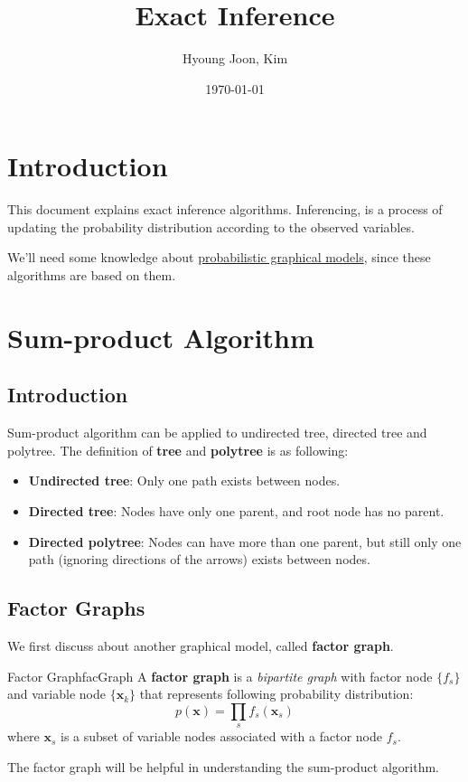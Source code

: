 \documentclass{article}
\title{Exact Inference}
\author{Hyoung Joon, Kim}
\date{\today}
\begin{document}
\maketitle
\tableofcontents
\newpage

\section{Introduction}
    This document explains exact inference algorithms. Inferencing, is a process of updating
    the probability distribution according to the observed variables.

    We'll need some knowledge about \href{run:../../_theory/PGM/PGM.pdf}{probabilistic graphical models}, since these algorithms are
    based on them.
    
\section{Sum-product Algorithm}
    \subsection{Introduction}
        Sum-product algorithm can be applied to undirected tree, directed tree and polytree.
        The definition of \textbf{tree} and \textbf{polytree} is as following:
        \begin{itemize}
            \item \textbf{Undirected tree}: Only one path exists between nodes.
            \item \textbf{Directed tree}: Nodes have only one parent, and root node has no parent.
            \item \textbf{Directed polytree}: Nodes can have more than one parent, but still only one path
            (ignoring directions of the arrows) exists between nodes.
        \end{itemize}
    \subsection{Factor Graphs}
        We first discuss about another graphical model, called \textbf{factor graph}.
        \begin{defn}{Factor Graph}{facGraph}
            A \textbf{factor graph} is a \emph{bipartite graph} with factor node $\{f_s\}$ and variable node $\{\textbf{x}_k\}$ 
            that represents following probability distribution:
            \[
            p(\textbf{x})=\prod_{s} f_s(\textbf{x}_s)
            \]
            where $\textbf{x}_s$ is a subset of variable nodes associated with a factor node $f_s$.
        \end{defn}
        The factor graph will be helpful in understanding the sum-product algorithm.
        
\end{document}
